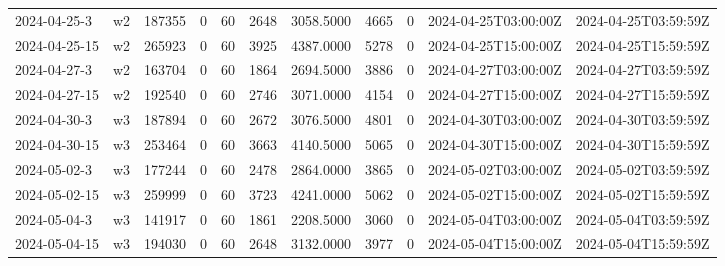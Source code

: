 \begin{table}
\begin{tabular}{llrrrrrrrll}
2024-04-25-3 & w2 & 187355 & 0 & 60 & 2648 & 3058.5000 & 4665 & 0 & 2024-04-25T03:00:00Z & 2024-04-25T03:59:59Z \\
2024-04-25-15 & w2 & 265923 & 0 & 60 & 3925 & 4387.0000 & 5278 & 0 & 2024-04-25T15:00:00Z & 2024-04-25T15:59:59Z \\
2024-04-27-3 & w2 & 163704 & 0 & 60 & 1864 & 2694.5000 & 3886 & 0 & 2024-04-27T03:00:00Z & 2024-04-27T03:59:59Z \\
2024-04-27-15 & w2 & 192540 & 0 & 60 & 2746 & 3071.0000 & 4154 & 0 & 2024-04-27T15:00:00Z & 2024-04-27T15:59:59Z \\
2024-04-30-3 & w3 & 187894 & 0 & 60 & 2672 & 3076.5000 & 4801 & 0 & 2024-04-30T03:00:00Z & 2024-04-30T03:59:59Z \\
2024-04-30-15 & w3 & 253464 & 0 & 60 & 3663 & 4140.5000 & 5065 & 0 & 2024-04-30T15:00:00Z & 2024-04-30T15:59:59Z \\
2024-05-02-3 & w3 & 177244 & 0 & 60 & 2478 & 2864.0000 & 3865 & 0 & 2024-05-02T03:00:00Z & 2024-05-02T03:59:59Z \\
2024-05-02-15 & w3 & 259999 & 0 & 60 & 3723 & 4241.0000 & 5062 & 0 & 2024-05-02T15:00:00Z & 2024-05-02T15:59:59Z \\
2024-05-04-3 & w3 & 141917 & 0 & 60 & 1861 & 2208.5000 & 3060 & 0 & 2024-05-04T03:00:00Z & 2024-05-04T03:59:59Z \\
2024-05-04-15 & w3 & 194030 & 0 & 60 & 2648 & 3132.0000 & 3977 & 0 & 2024-05-04T15:00:00Z & 2024-05-04T15:59:59Z \\
\bottomrule
\end{tabular}
\end{table}
